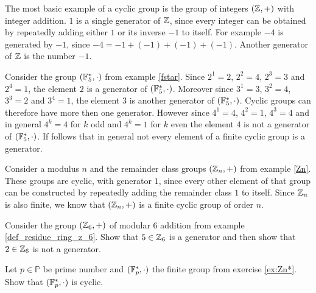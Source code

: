 \begin{example}
\label{example:cyclic_group_of_integers} The most basic example of a cyclic group is the group of integers $(\mathbb{Z},+)$ with integer addition. $1$ is a single generator of $\mathbb{Z}$, since every integer can be obtained by repeatedly adding either $1$ or its inverse $-1$ to itself. For example $-4$ is generated by $-1$, since $-4=-1+(-1)+(-1)+(-1)$. Another generator of $\mathbb{Z}$ is the number $-1$.
\end{example}
\begin{example}
\label{example:cyclic_group_F5*} Consider the group $(\mathbb{F}_5^*,\cdot)$ from example \ref{fstar}. Since $2^1=2$, $2^2=4$, $2^3=3$ and $2^4=1$, the element $2$ is a generator of $(\mathbb{F}_5^*,\cdot)$. Moreover since $3^1=3$, $3^2=4$, $3^3=2$ and $3^4=1$, the element $3$ is another generator of $(\mathbb{F}_5^*,\cdot)$. Cyclic groups can therefore have more then one generator. However since $4^1=4$, $4^2=1$, $4^3=4$ and in general $4^k=4$ for $k$ odd and $4^k=1$ for $k$ even the element $4$ is not a generator of $(\mathbb{F}_5^*,\cdot)$. If follows that in general not every element of a finite cyclic group is a generator.
\end{example}
\begin{example} Consider a modulus $n$ and the remainder class groups $(\mathbb{Z}_n,+)$ from example \ref{Zn}. These groups are cyclic, with generator $1$, since every other element of that group can be constructed by repeatedly adding the remainder class $1$ to itself. Since $\mathbb{Z}_n$ is also finite, we know that $(\mathbb{Z}_n,+)$ is a finite cyclic group of order $n$.
\end{example}
\begin{exercise}
\label{example:cyclic_group_F6}
Consider the group $(\mathbb{Z}_6,+)$ of modular 6 addition from example \ref{def_residue_ring_z_6}. Show that $5\in \mathbb{Z}_6$ is a generator and then show that $2\in \mathbb{Z}_6$ is not a generator.
\end{exercise}
\begin{exercise}\label{ex:modulus-prime-group} Let $p\in\mathbb{P}$ be prime number and $(\mathbb{F}_p^*,\cdot)$ the finite group from exercise \ref{ex:Zn*}. Show that $(\mathbb{F}_p^*,\cdot)$ is cyclic.
\end{exercise}

